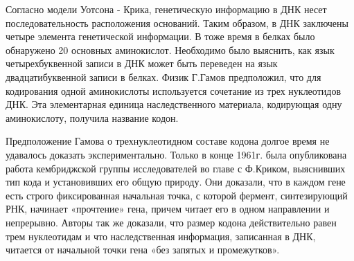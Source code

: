 \documentclass[exam_answers.tex]{subfiles}
\begin{document}
Согласно модели Уотсона - Крика, генетическую информацию в ДНК
несет последовательность расположения оснований. Таким образом, в ДНК
заключены четыре элемента генетической информации. В тоже время в белках
было обнаружено 20 основных аминокислот. Необходимо было выяснить, как
язык четырехбуквенной записи в ДНК может быть переведен на язык
двадцатибуквенной записи в белках. Физик Г.Гамов предположил, что для
кодирования одной аминокислоты используется сочетание из трех нуклеотидов
ДНК.
Эта элементарная единица наследственного материала, кодирующая
одну аминокислоту, получила название кодон.

Предположение Гамова о трехнуклеотидном составе кодона долгое
время не удавалось доказать экспериментально. Только в конце 1961г. была
опубликована работа кембриджской группы исследователей во главе с
Ф.Криком, выяснивших тип кода и установивших его общую природу. Они
доказали, что в каждом гене есть строго фиксированная начальная точка, с
которой фермент, синтезирующий РНК, начинает «прочтение» гена, причем
читает его в одном направлении и непрерывно. Авторы так же доказали, что
размер кодона действительно равен трем нуклеотидам и что наследственная
информация, записанная в ДНК, читается от начальной точки гена «без запятых
и промежутков».
\end{document}

